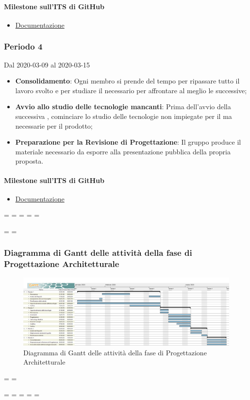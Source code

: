 \paragraph{Milestone sull'ITS di GitHub}
\begin{itemize}
	\item \href{https://github.com/qb-team/Stalker-Documentazione/milestone/10}{Documentazione}
\end{itemize}

\subsubsection{Periodo 4} 
Dal 2020-03-09 al 2020-03-15
\begin{itemize}
	\item \textbf{Consolidamento}: Ogni membro si prende del tempo per ripassare tutto il lavoro svolto e per studiare il necessario per affrontare al meglio le  successive;
	\item \textbf{Avvio allo studio delle tecnologie mancanti}: Prima dell'avvio della successiva , cominciare lo studio delle tecnologie non impiegate per il  ma necessarie per il prodotto;
	\item \textbf{Preparazione per la Revisione di Progettazione}: Il gruppo produce il materiale necessario da esporre alla presentazione pubblica della propria proposta.
\end{itemize}
\paragraph{Milestone sull'ITS di GitHub}
\begin{itemize}
	\item \href{https://github.com/qb-team/Stalker-Documentazione/milestone/14}{Documentazione}
\end{itemize}

\newpage
\paperwidth=\pdfpageheight
\paperheight=\pdfpagewidth
\pdfpageheight=\paperheight
\pdfpagewidth=\paperwidth
\headwidth=\textheight

\begingroup 
\vsize=\textwidth
\hsize=\textheight

\subsubsection{Diagramma di Gantt delle attività della fase di Progettazione Architetturale}
\pagestyle{empty}
\begin{figure}[h]
	\centering
	\includegraphics[scale=0.38]{Sezioni/DiagrammiGantt/ProgettazioneArchitetturale.png}
	\caption{Diagramma di Gantt delle attività della fase di Progettazione Architetturale}	
\end{figure}

\textwidth=\hsize
\textheight=\vsize

\endgroup
\newpage
\paperwidth=\pdfpageheight
\paperheight=\pdfpagewidth
\pdfpageheight=\paperheight
\pdfpagewidth=\paperwidth
\headwidth=\textwidth